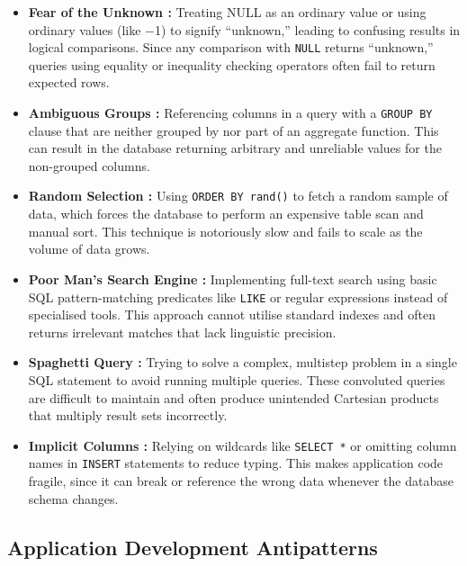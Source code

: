 \begin{itemize}
    \item \textbf{Fear of the Unknown :} Treating NULL as an ordinary value or using ordinary values (like \num{-1}) to signify “unknown,” leading to confusing results in logical comparisons. Since any comparison with \texttt{NULL} returns “unknown,” queries using equality or inequality checking operators often fail to return expected rows.
    \item \textbf{Ambiguous Groups :} Referencing columns in a query with a \texttt{GROUP BY} clause that are neither grouped by nor part of an aggregate function. This can result in the database returning arbitrary and unreliable values for the non-grouped columns.
    \item \textbf{Random Selection :} Using \texttt{ORDER BY rand()} to fetch a random sample of data, which forces the database to perform an expensive table scan and manual sort. This technique is notoriously slow and fails to scale as the volume of data grows.
    \item \textbf{Poor Man's Search Engine :} Implementing full-text search using basic SQL pattern-matching predicates like \texttt{LIKE} or regular expressions instead of specialised tools. This approach cannot utilise standard indexes and often returns irrelevant matches that lack linguistic precision.
    \item \textbf{Spaghetti Query :} Trying to solve a complex, multistep problem in a single SQL statement to avoid running multiple queries. These convoluted queries are difficult to maintain and often produce unintended Cartesian products that multiply result sets incorrectly.
    \item \textbf{Implicit Columns :} Relying on wildcards like \texttt{SELECT *} or omitting column names in \texttt{INSERT} statements to reduce typing. This makes application code fragile, since it can break or reference the wrong data whenever the database schema changes.
\end{itemize}

\subsection{Application Development Antipatterns}\label{sec:developmentAntipatterns}

